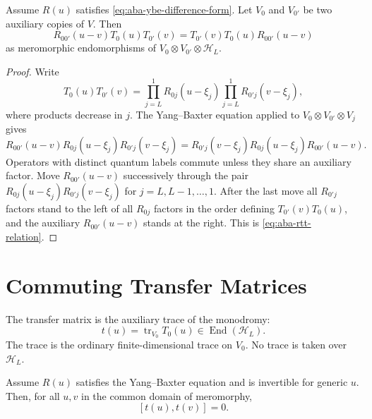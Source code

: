 \begin{proposition}
\label{prop:aba-rtt}
Assume \(R(u)\) satisfies \eqref{eq:aba-ybe-difference-form}.  Let \(V_0\) and
\(V_{0'}\) be two auxiliary copies of \(V\).  Then
\begin{equation}
  R_{00'}(u-v)T_0(u)T_{0'}(v)
  =
  T_{0'}(v)T_0(u)R_{00'}(u-v)
  \label{eq:aba-rtt-relation}
\end{equation}
as meromorphic endomorphisms of
\(V_0\otimes V_{0'}\otimes\mathcal H_L\).
\end{proposition}

\begin{proof}
Write
\[
  T_0(u)T_{0'}(v)
  =
  \prod_{j=L}^{1}R_{0j}(u-\xi_j)
  \prod_{j=L}^{1}R_{0'j}(v-\xi_j),
\]
where products decrease in \(j\).  The Yang--Baxter equation applied to
\(V_0\otimes V_{0'}\otimes V_j\) gives
\[
  R_{00'}(u-v)R_{0j}(u-\xi_j)R_{0'j}(v-\xi_j)
  =
  R_{0'j}(v-\xi_j)R_{0j}(u-\xi_j)R_{00'}(u-v).
\]
Operators with distinct quantum labels commute unless they share an auxiliary
factor.  Move \(R_{00'}(u-v)\) successively through the pair
\(R_{0j}(u-\xi_j)R_{0'j}(v-\xi_j)\) for \(j=L,L-1,\ldots,1\).  After the last
move all \(R_{0'j}\) factors stand to the left of all \(R_{0j}\) factors in
the order defining \(T_{0'}(v)T_0(u)\), and the auxiliary \(R_{00'}(u-v)\)
stands at the right.  This is \eqref{eq:aba-rtt-relation}.
\end{proof}

\section{Commuting Transfer Matrices}

The transfer matrix is the auxiliary trace of the monodromy:
\begin{equation}
  t(u)=\operatorname{tr}_{V_0}T_0(u)
  \in \operatorname{End}(\mathcal H_L).
  \label{eq:aba-transfer-matrix}
\end{equation}
The trace is the ordinary finite-dimensional trace on \(V_0\).  No trace is
taken over \(\mathcal H_L\).

\begin{proposition}
\label{prop:aba-transfer-commutativity}
Assume \(R(u)\) satisfies the Yang--Baxter equation and is invertible for
generic \(u\).  Then, for all \(u,v\) in the common domain of meromorphy,
\[
  [t(u),t(v)]=0 .
\]
\end{proposition}


